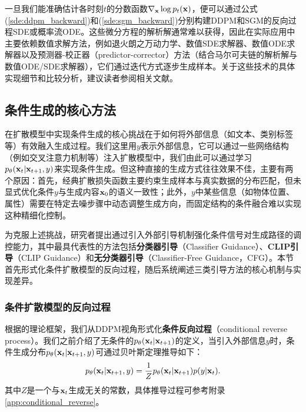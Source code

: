 \documentclass[11pt,a4paper,UTF8]{ctexart}
\begin{document}
一旦我们能准确估计各时刻$t$的分数函数$\nabla_{\mathbf{x}}\log p_t(\mathbf{x})$，便可以通过公式(\ref{sde:ddpm_backward})和(\ref{sde:sgm_backward})分别构建DDPM和SGM的反向过程SDE或概率流ODE。这些微分方程的解析解通常难以获得，因此在实际应用中主要依赖数值求解方法，例如退火朗之万动力学\cite{song2019generative}、数值SDE求解器\cite{jolicoeur2021gotta,song2020score}、数值ODE求解器\cite{karras2022elucidating,lu2022dpm,song2020denoising,song2020score}以及预测器-校正器（predictor-corrector）方法（结合马尔可夫链的解析解与数值ODE/SDE求解器）\cite{song2020score}，它们通过迭代方式逐步生成样本。关于这些技术的具体实现细节和比较分析，建议读者参阅相关文献。

\subsection{条件生成的核心方法}

在扩散模型中实现条件生成的核心挑战在于如何将外部信息（如文本、类别标签等）有效融入生成过程。我们这里用$y$表示外部信息，它可以通过一些网络结构（例如交叉注意力机制\cite{chen2021crossvit}等）注入扩散模型中，我们由此可以通过学习$p_{\theta}(\mathbf{x}_t|\mathbf{x}_{t+1},y)$来实现条件生成。但这种直接的生成方式往往效果不佳，主要有两个原因：首先，经典扩散损失函数主要约束生成样本与真实数据的分布匹配，但未显式优化条件$y$与生成内容$\mathbf{x}_0$的语义一致性；此外，$y$中某些信息（如物体位置、属性）需要在特定去噪步骤中动态调整生成方向，而固定结构的条件融合难以实现这种精细化控制\cite{saharia2022photorealistic}。

为克服上述挑战，研究者提出通过引入外部引导机制强化条件信号对生成路径的调控能力，其中最具代表性的方法包括\textbf{分类器引导}（Classifier Guidance）、\textbf{CLIP引导}（CLIP Guidance）和\textbf{无分类器引导}（Classifier-Free Guidance，CFG）。本节首先形式化条件扩散模型的反向过程，随后系统阐述三类引导方法的核心机制与实现差异。

\subsubsection{条件扩散模型的反向过程}

根据\cite{dhariwal2021diffusion}的理论框架，我们从DDPM视角形式化\textbf{条件反向过程}（conditional reverse process）。我们之前介绍了无条件的$p_{\theta}(\mathbf{x}_{t}|\mathbf{x}_{t+1})$的定义，当引入外部信息$y$时，条件生成分布$p_{\theta}(\mathbf{x}_{t}|\mathbf{x}_{t+1},y)$可通过贝叶斯定理推导如下：
\begin{equation}
    p_{\theta}(\mathbf{x}_{t}|\mathbf{x}_{t+1},y) = \frac{1}{Z} p_\theta(\mathbf{x}_{t}|\mathbf{x}_{t+1})p(y|\mathbf{x}_t).
\label{conditional:backward}  
\end{equation}
其中$Z$是一个与$\mathbf{x}_{t}$生成无关的常数，具体推导过程可参考附录\ref{app:conditional_reverse}。
\end{document}
